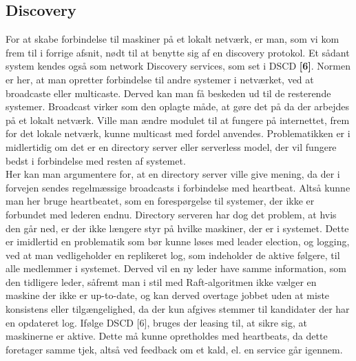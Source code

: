 \documentclass[a4paper,12pt]{article}
\begin{document}
\subsection{Discovery}
For at skabe forbindelse til maskiner på et lokalt netværk, er man, som vi kom frem til i forrige afsnit, nødt til at benytte sig af en discovery protokol. Et sådant system kendes også som network Discovery services, som set i DSCD \textbf{[6]}. Normen er her, at man opretter forbindelse til andre systemer i netværket, ved at broadcaste eller multicaste. Derved kan man få beskeden ud til de resterende systemer. Broadcast virker som den oplagte måde, at gøre det på da der arbejdes på et lokalt netværk.
Ville man ændre modulet til at fungere på internettet, frem for det lokale netværk, kunne multicast med fordel anvendes.
Problematikken er i midlertidig om det er en directory server eller serverless model, der vil fungere bedst i forbindelse med resten af systemet.
\\
Her kan man argumentere for, at en directory server ville give mening, da der i forvejen sendes regelmæssige broadcasts i forbindelse med heartbeat. Altså kunne man her bruge heartbeatet, som en forespørgelse til systemer, der ikke er forbundet med lederen endnu.
Directory serveren har dog det problem, at hvis den går ned, er der ikke længere styr på hvilke maskiner, der er i systemet. Dette er imidlertid en problematik som bør kunne løses med leader election, og logging, ved at man vedligeholder en replikeret log, som indeholder de aktive følgere, til alle medlemmer i systemet. Derved vil en ny leder have samme information, som den tidligere leder, såfremt man i stil med Raft-algoritmen ikke vælger en maskine der ikke er up-to-date, og kan derved overtage jobbet uden at miste konsistens eller tilgængelighed, da der kun afgives stemmer til kandidater der har en opdateret log. Ifølge DSCD [6], bruges der leasing til, at sikre sig, at maskinerne er aktive. Dette må kunne opretholdes med heartbeats, da dette foretager samme tjek, altså ved feedback om et kald, el. en service går igennem.
\end{document}
